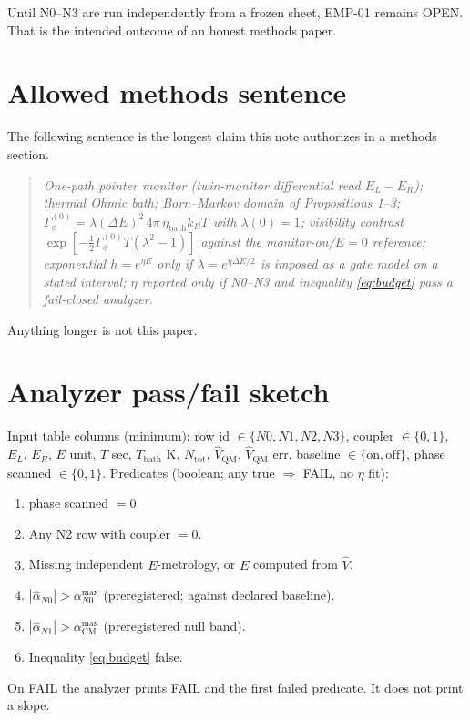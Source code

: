 \documentclass[11pt]{article}
\theoremstyle{definition}
\theoremstyle{plain}
\begin{document}
Until N0--N3 are run independently from a frozen sheet, EMP-01 remains OPEN. That is the
intended outcome of an honest methods paper.

\begin{appendix}
\section{Allowed methods sentence}\label{app:methods}

The following sentence is the longest claim this note authorizes in a methods section.
\begin{quote}
\itshape
One-path pointer monitor (twin-monitor differential read $E_L - E_R$); thermal Ohmic bath;
Born--Markov domain of Propositions 1--3; $\Gamma_\phi^{(0)} = \lambda(\Delta E)^2\, 4\pi\,\eta_{\mathrm{bath}} k_B T$
with $\lambda(0)=1$; visibility contrast $\exp[-\tfrac12 \Gamma_\phi^{(0)}T(\lambda^2-1)]$ against the
monitor-on/$E{=}0$ reference; exponential $h = e^{\eta E}$ only if $\lambda = e^{\eta\Delta E/2}$ is imposed
as a gate model on a stated interval; $\eta$ reported only if N0--N3 and inequality \eqref{eq:budget}
pass a fail-closed analyzer.
\end{quote}
Anything longer is not this paper.

\section{Analyzer pass/fail sketch}

Input table columns (minimum): row id $\in \{N0,N1,N2,N3\}$, coupler $\in \{0,1\}$,
$E_L$, $E_R$, $E$ unit, $T$ sec, $T_{\mathrm{bath}}$ K, $N_{\mathrm{tot}}$, $\hat V_{\mathrm{QM}}$,
$\hat V_{\mathrm{QM}}$ err, baseline $\in \{\mathrm{on},\mathrm{off}\}$, phase scanned $\in \{0,1\}$.
Predicates (boolean; any true $\Rightarrow$ FAIL, no $\eta$ fit):
\begin{enumerate}
\item phase scanned $=0$.
\item Any N2 row with coupler $=0$.
\item Missing independent $E$-metrology, or $E$ computed from $\hat V$.
\item $|\hat\alpha_{N0}| > \alpha_{N0}^{\max}$ (preregistered; against declared baseline).
\item $|\hat\alpha_{N1}| > \alpha_{\mathrm{CM}}^{\max}$ (preregistered null band).
\item Inequality \eqref{eq:budget} false.
\end{enumerate}
On FAIL the analyzer prints FAIL and the first failed predicate. It does not print a slope.
\end{appendix}
\end{document}
